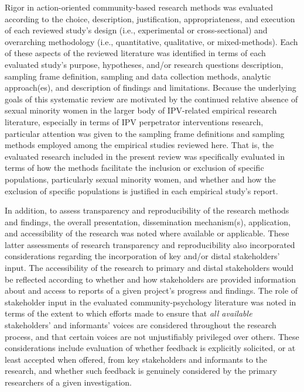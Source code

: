 \documentclass[11pt,]{tufte-book}
\begin{document}
Rigor in action-oriented community-based research methods was evaluated
according to the choice, description, justification, appropriateness,
and execution of each reviewed study's design (i.e., experimental or
cross-sectional) and overarching methodology (i.e., quantitative,
qualitative, or mixed-methods). Each of these aspects of the reviewed
literature was identified in terms of each evaluated study's purpose,
hypotheses, and/or research questions description, sampling frame
definition, sampling and data collection methods, analytic approach(es),
and description of findings and limitations. Because the underlying
goals of this systematic review are motivated by the continued relative
absence of sexual minority women in the larger body of IPV-related
empirical research literature, especially in terms of IPV perpetrator
interventions research, particular attention was given to the sampling
frame definitions and sampling methods employed among the empirical
studies reviewed here. That is, the evaluated research included in the
present review was specifically evaluated in terms of how the methods
facilitate the inclusion or exclusion of specific populations,
particularly sexual minority women, and whether and how the exclusion of
specific populations is justified in each empirical study's report.

In addition, to assess transparency and reproducibility of the research
methods and findings, the overall presentation, dissemination
mechanism(s), application, and accessibility of the research was noted
where available or applicable. These latter assessments of research
transparency and reproducibility also incorporated considerations
regarding the incorporation of key and/or distal stakeholders' input.
The accessibility of the research to primary and distal stakeholders
would be reflected according to whether and how stakeholders are
provided information about and access to reports of a given project's
progress and findings. The role of stakeholder input in the evaluated
community-psychology literature was noted in terms of the extent to
which efforts made to ensure that \emph{all available} stakeholders' and
informants' voices are considered throughout the research process, and
that certain voices are not unjustifiably privileged over others. These
considerations include evaluation of whether feedback is explicitly
solicited, or at least accepted when offered, from key stakeholders and
informants to the research, and whether such feedback is genuinely
considered by the primary researchers of a given investigation.
\end{document}
